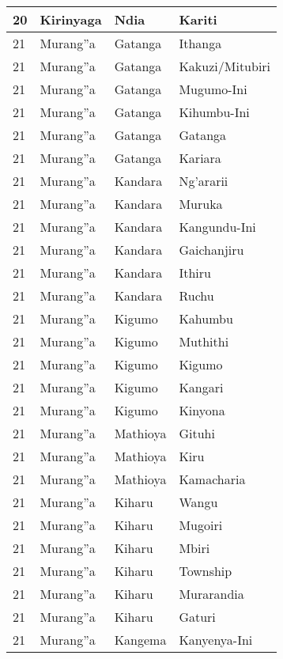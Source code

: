 \begin{table}[!ht]
\begin{tabular}{|l|l|l|l|}
        20 & Kirinyaga & Ndia & Kariti \\ \hline
        21 & Murang''a & Gatanga & Ithanga \\ \hline
        21 & Murang''a & Gatanga & Kakuzi/Mitubiri \\ \hline
        21 & Murang''a & Gatanga & Mugumo-Ini \\ \hline
        21 & Murang''a & Gatanga & Kihumbu-Ini \\ \hline
        21 & Murang''a & Gatanga & Gatanga \\ \hline
        21 & Murang''a & Gatanga & Kariara \\ \hline
        21 & Murang''a & Kandara & Ng’ararii \\ \hline
        21 & Murang''a & Kandara & Muruka \\ \hline
        21 & Murang''a & Kandara & Kangundu-Ini \\ \hline
        21 & Murang''a & Kandara & Gaichanjiru \\ \hline
        21 & Murang''a & Kandara & Ithiru \\ \hline
        21 & Murang''a & Kandara & Ruchu \\ \hline
        21 & Murang''a & Kigumo & Kahumbu \\ \hline
        21 & Murang''a & Kigumo & Muthithi \\ \hline
        21 & Murang''a & Kigumo & Kigumo \\ \hline
        21 & Murang''a & Kigumo & Kangari \\ \hline
        21 & Murang''a & Kigumo & Kinyona \\ \hline
        21 & Murang''a & Mathioya & Gituhi \\ \hline
        21 & Murang''a & Mathioya & Kiru \\ \hline
        21 & Murang''a & Mathioya & Kamacharia \\ \hline
        21 & Murang''a & Kiharu & Wangu \\ \hline
        21 & Murang''a & Kiharu & Mugoiri \\ \hline
        21 & Murang''a & Kiharu & Mbiri \\ \hline
        21 & Murang''a & Kiharu & Township \\ \hline
        21 & Murang''a & Kiharu & Murarandia \\ \hline
        21 & Murang''a & Kiharu & Gaturi \\ \hline
        21 & Murang''a & Kangema & Kanyenya-Ini \\ \hline

\end{tabular}
\end{table}
